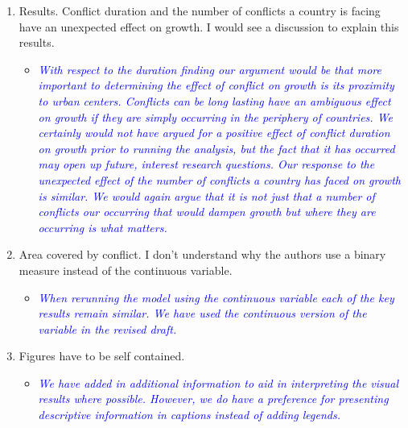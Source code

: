 \begin{enumerate}
\item Results. Conflict duration and the number of conflicts a country is facing have an unexpected effect on growth. I would see a discussion to explain this results.

\begin{itemize}
\item \textcolor{blue}{\emph{
	With respect to the duration finding our argument would be that more important to determining the effect of conflict on growth is its proximity to urban centers. Conflicts can be long lasting have an ambiguous effect on growth if they are simply occurring in the periphery of countries. We certainly would not have argued for a positive effect of conflict duration on growth prior to running the analysis, but the fact that it has occurred may open up future, interest research questions. 
	Our response to the unexpected effect of the number of conflicts a country has faced on growth is similar. We would again argue that it is not just that a number of conflicts our occurring that would dampen growth but where they are occurring is what matters. 
}}
\end{itemize}

\item Area covered by conflict. I don’t understand why the authors use a binary measure instead of the continuous variable.

\begin{itemize}
\item \textcolor{blue}{\emph{
	When rerunning the model using the continuous variable each of the key results remain similar. We have used the continuous version of the variable in the revised draft.
}}
\end{itemize}


	

\item Figures have to be self contained.

\begin{itemize}
\item \textcolor{blue}{\emph{
	We have added in additional information to aid in interpreting the visual results where possible. However, we do have a preference for presenting descriptive information in captions instead of adding legends. 
}}
\end{itemize}


\end{enumerate}
